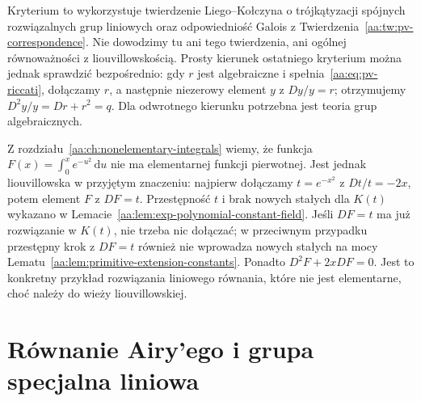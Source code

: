 \begin{uwaga}
\label{aa:uw:pv-lie-kolchin}
Kryterium to wykorzystuje
twierdzenie Liego--Kołczyna
o trójkątyzacji spójnych
rozwiązalnych grup liniowych
oraz odpowiedniość Galois
z Twierdzenia~\ref{aa:tw:pv-correspondence}.
Nie dowodzimy tu ani tego
twierdzenia, ani ogólnej
równoważności z liouvillowskością.
Prosty kierunek ostatniego
kryterium można jednak
sprawdzić bezpośrednio:
gdy $r$ jest algebraiczne
i spełnia~\eqref{aa:eq:pv-riccati},
dołączamy $r$, a następnie
niezerowy element $y$ z
$Dy/y=r$; otrzymujemy
$D^2y/y=Dr+r^2=q$.
Dla odwrotnego kierunku
potrzebna jest teoria
grup algebraicznych.
\end{uwaga}

\begin{przyklad}
\label{aa:prz:pv-erf-liouvillian}
Z rozdziału~\ref{aa:ch:nonelementary-integrals}
wiemy, że funkcja
$F(x)=\int_0^x e^{-u^2}\,\mathrm du$
nie ma elementarnej funkcji pierwotnej.
Jest jednak liouvillowska
w przyjętym znaczeniu:
najpierw dołączamy
$t=e^{-x^2}$ z
$Dt/t=-2x$, potem
element $F$ z $DF=t$.
Przestępność $t$ i brak nowych
stałych dla $K(t)$ wykazano
w Lemacie~\ref{aa:lem:exp-polynomial-constant-field}.
Jeśli $DF=t$ ma już rozwiązanie
w $K(t)$, nie trzeba nic
dołączać; w przeciwnym przypadku
przestępny krok z $DF=t$
również nie wprowadza nowych
stałych na mocy
Lematu~\ref{aa:lem:primitive-extension-constants}.
Ponadto $D^2F+2xDF=0$.
Jest to konkretny przykład
rozwiązania liniowego równania,
które nie jest elementarne,
choć należy do wieży liouvillowskiej.
\end{przyklad}

\section{Równanie Airy'ego i grupa specjalna liniowa}

